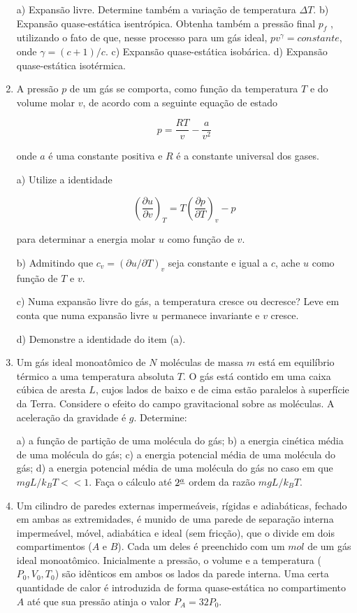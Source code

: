 \begin{enumerate}[start=1,label={\bfseries Q\arabic*.}]
a) Expansão livre. Determine também a variação de temperatura $\Delta T$.
b) Expansão quase-estática isentrópica. Obtenha também a pressão final $p_{f}$ , utilizando o fato de que, nesse processo para um gás ideal, $pv^{\gamma} = constante$, onde $\gamma = (c + 1)/c$.
c) Expansão quase-estática isobárica.
d) Expansão quase-estática isotérmica.




\item A pressão $p$ de um gás se comporta, como função da temperatura $T$ e do volume molar $v$, de acordo com a seguinte equação de estado

$$
p=\frac{R T}{v}-\frac{a}{v^{2}}
$$

onde $a$ é uma constante positiva e $R$ é a constante universal dos gases.


  a) Utilize a identidade

  $$
  \left(\frac{\partial u}{\partial v}\right)_{T}=T\left(\frac{\partial p}{\partial T}\right)_{v}-p
  $$

para determinar a energia molar $u$ como função de $v$.

b) Admitindo que $c_{v} = (\partial u/ \partial T)_{v}$ seja constante e igual a $c$, ache $u$ como função de $T$ e $v$.

c) Numa expansão livre do gás, a temperatura cresce ou decresce? Leve em conta que numa expansão livre $u$ permanece invariante e $v$ cresce.

d) Demonstre a identidade do item (a).





\item Um gás ideal monoatômico de $N$ moléculas de massa $m$ está em equilíbrio térmico a uma temperatura absoluta $T$. O gás está contido em uma caixa cúbica de aresta $L$, cujos lados de baixo e de cima estão paralelos à superfície da Terra. Considere o efeito do campo gravitacional sobre as moléculas. A aceleração da gravidade é $g$. Determine:


a) a função de partição de uma molécula do gás;
b) a energia cinética média de uma molécula do gás;
c) a energia potencial média de uma molécula do gás;
d) a energia potencial média de uma molécula do gás no caso em que $mgL / k_{B}T << 1$. Faça o cálculo até $2^{\footnotesize{\underline{a}}}$ ordem da razão $mgL/k_{B}T$.



\item Um cilindro de paredes externas impermeáveis, rígidas e adiabáticas, fechado em ambas as extremidades, é munido de uma parede de separação interna impermeável, móvel, adiabática e ideal (sem fricção), que o divide em dois compartimentos ($A$ e $B$). Cada um deles é preenchido com um $mol$ de um gás ideal monoatômico. Inicialmente a pressão, o volume e a temperatura ($P_{0},V_{0},T_{0}$) são idênticos em ambos os lados da parede interna. Uma certa quantidade de calor é introduzida de forma quase-estática no compartimento $A$ até que sua pressão atinja o valor $P_{A} = 32P_{0}$.



\end{enumerate}
